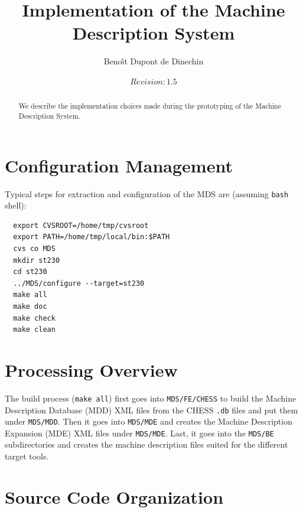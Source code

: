 \documentclass[11pt,a4paper]{article}
\title{Implementation of the Machine Description System}
\author{Beno\^{\i}t Dupont de Dinechin}
\date{%
$Revision: 1.5 $
}
\begin{document}
\maketitle

\begin{abstract}

We describe the implementation choices made during the prototyping of the
Machine Description System.

\end{abstract}

\section{Configuration Management}

Typical steps for extraction and configuration of the MDS are (assuming
\texttt{bash} shell):

\begin{verbatim}
  export CVSROOT=/home/tmp/cvsroot
  export PATH=/home/tmp/local/bin:$PATH
  cvs co MDS
  mkdir st230
  cd st230
  ../MDS/configure --target=st230
  make all
  make doc
  make check
  make clean
\end{verbatim}
 
\section{Processing Overview}

The build process (\texttt{make all}) first goes into \texttt{MDS/FE/CHESS} to
build the Machine Description Database (MDD) XML files from the CHESS
\texttt{.db} files and put them under \texttt{MDS/MDD}. Then it goes into
\texttt{MDS/MDE} and creates the Machine Description Expansion (MDE) XML files
under \texttt{MDS/MDE}.  Last, it goes into the \texttt{MDS/BE} subdirectories
and creates the machine description files suited for the different target tools.

\section{Source Code Organization}
\end{document}
